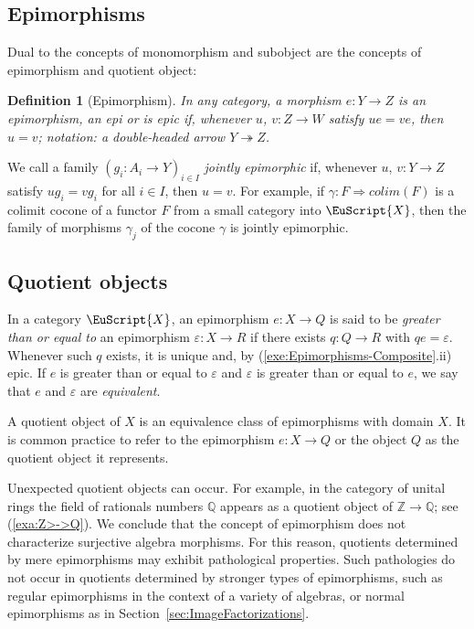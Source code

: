 \documentclass [12pt,oneside]{book}%
\theoremstyle{captionstyle}  %
\newtheorem{definition}[theorem]{Definition}
\newcommand{\IndSep}{\qquad}
\newcommand{\Defn}[1]{\emph{#1}}
\newcommand{\from}{\colon}				%
\newcommand{\Epi}{\twoheadrightarrow}			%
\newcommand{\ZNr}{\mathbb{Z}}		%
\newcommand{\QNr}{\mathbb{Q}}		%
\newcommand{\SACtgry}[1]{\EuScript{#1}}			%
\newcommand{\CoLimOf}[1]{\textit{colim}\left(#1\right)}		%
\begin{document}
\subsection*{Epimorphisms}

Dual to the concepts of monomorphism and subobject are the concepts of epimorphism and quotient object:

\begin{definition}[Epimorphism]
    \label{def:Epimorphism}%
    In any category, a morphism $e\from Y\to Z$ is an \Defn{epimorphism}, an \Defn{epi} or \Defn{is epic} if, whenever $u$, $v\from Z\to W$ satisfy $ue=ve$, then $u=v$; notation: a double-headed arrow $Y\Epi Z$.%
    \index[not]{e!$Y\Epi Z$\IndSep epimorphism}%
\end{definition}

We call a family $(g_i\from A_i\to Y)_{i\in I}$ \Defn{jointly epimorphic} if, whenever $u$, $v\from Y\to Z$ satisfy $ug_i=vg_i$ for all $i\in I$, then $u=v$. For example, if $\gamma\from F\Rightarrow \CoLimOf{F}$ is a colimit cocone of a functor $F$ from a small category into $\SACtgry{X}$, then the family of morphisms $\gamma_j$ of the cocone $\gamma$ is jointly epimorphic.%


\subsection*{Quotient objects}

In a category $\SACtgry{X}$, an epimorphism $e\from X\to Q$ is said to be \Defn{greater than or equal to} an epimorphism $\varepsilon\from X\to R$ if there exists $q\from Q\to R$ with $qe=\varepsilon$. Whenever such $q$ exists, it is unique and, by (\ref{exe:Epimorphisms-Composite}.ii) epic. If $e$ is greater than or equal to $\varepsilon$ and $\varepsilon$ is greater than or equal to $e$, we say that $e$ and $\varepsilon$ are \Defn{equivalent}. %

A quotient object of $X$ is an equivalence class of epimorphisms with domain $X$. It is common practice to refer to the epimorphism $e\from X\to Q$ or the object $Q$ as the quotient object it represents. %

Unexpected quotient objects can occur. For example, in the category of unital rings the field of rationals numbers $\QNr$ appears as a quotient object of $\ZNr\to \QNr$; see (\ref{exa:Z>->Q}). We conclude that the concept of epimorphism does not characterize surjective algebra morphisms. For this reason, quotients determined by mere epimorphisms may exhibit pathological properties. Such pathologies do not occur in quotients determined by stronger types of epimorphisms, such as regular epimorphisms in the context of a variety of algebras, or normal epimorphisms as in Section~\ref{sec:ImageFactorizations}.%
\end{document}
